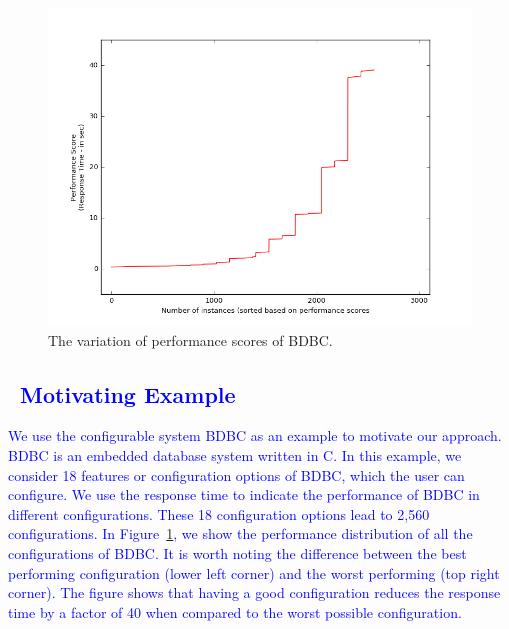 \documentclass[smallextended]{svjour3}       %
\newcommand{\respto}[1]{
    \fcolorbox{black}{black!15}{
    \label{response:#1}
    \textbf{R-{#1}}}
}
\begin{document}

\begin{figure}[t]
\centering
\includegraphics[width=\columnwidth]{Figures/motivation}
\caption{The variation of performance scores of BDBC. }
\label{fig:motivation}
\end{figure}


\textcolor{blue}{
\section{\respto{2e}~Motivating Example}
We use the configurable system BDBC as an example to motivate our approach. BDBC is an embedded database system  written  in C. In this example, we consider 18 features or configuration options of BDBC, which the user can configure. We use the response time to indicate the performance of BDBC in different configurations. These 18 configuration options lead to 2,560 configurations. 
In Figure~\ref{fig:motivation}, we show the performance distribution of all the configurations of BDBC. It is worth noting the difference between the best performing configuration (lower left corner) and the worst performing (top right corner). The figure shows that having a good configuration reduces the response time by a factor of 40 when compared to the worst possible configuration. 
}
\end{document}
